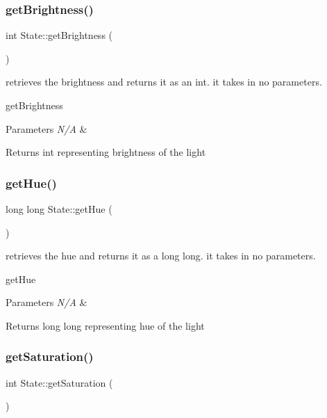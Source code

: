 \subsubsection{\texorpdfstring{get\+Brightness()}{getBrightness()}}
{\footnotesize\ttfamily int State\+::get\+Brightness (\begin{DoxyParamCaption}{ }\end{DoxyParamCaption})}



retrieves the brightness and returns it as an int. it takes in no parameters. 

get\+Brightness 
\begin{DoxyParams}{Parameters}
{\em N/A} & \\
\hline
\end{DoxyParams}
\begin{DoxyReturn}{Returns}
int representing brightness of the light 
\end{DoxyReturn}
\mbox{\label{class_state_a8f92126bdf14a5c0109e041f29747366}} 
\subsubsection{\texorpdfstring{get\+Hue()}{getHue()}}
{\footnotesize\ttfamily long long State\+::get\+Hue (\begin{DoxyParamCaption}{ }\end{DoxyParamCaption})}



retrieves the hue and returns it as a long long. it takes in no parameters. 

get\+Hue 
\begin{DoxyParams}{Parameters}
{\em N/A} & \\
\hline
\end{DoxyParams}
\begin{DoxyReturn}{Returns}
long long representing hue of the light 
\end{DoxyReturn}
\mbox{\label{class_state_aacba45740c95cd6a8efa6a441e90b1f4}} 
\subsubsection{\texorpdfstring{get\+Saturation()}{getSaturation()}}
{\footnotesize\ttfamily int State\+::get\+Saturation (\begin{DoxyParamCaption}{ }\end{DoxyParamCaption})}



